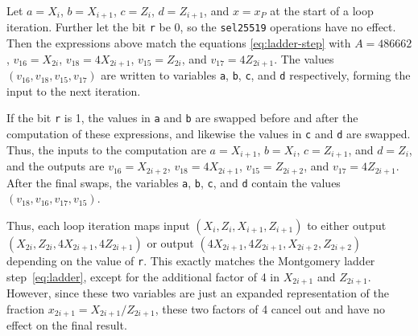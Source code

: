 \documentclass{article}
\begin{document}
Let $a = X_i$, $b = X_{i+1}$, $c = Z_i$, $d = Z_{i+1}$, and $x = x_P$ at the start of a loop iteration.
Further let the bit \verb|r| be 0, so the \verb|sel25519| operations have no effect.
Then the expressions above match the equations \eqref{eq:ladder-step} with $A = 486662$, $v_{16} = X_{2i}$, $v_{18} = 4X_{2i+1}$, $v_{15} = Z_{2i}$, and $v_{17} = 4Z_{2i+1}$.
The values $(v_{16}, v_{18}, v_{15}, v_{17})$ are written to variables \verb|a|, \verb|b|, \verb|c|, and \verb|d| respectively, forming the input to the next iteration.

If the bit \verb|r| is 1, the values in \verb|a| and \verb|b| are swapped before and after the computation of these expressions, and likewise the values in \verb|c| and \verb|d| are swapped.
Thus, the inputs to the computation are $a = X_{i+1}$, $b = X_i$, $c = Z_{i+1}$, and $d = Z_i$, and the outputs are $v_{16} = X_{2i+2}$, $v_{18} = 4X_{2i+1}$, $v_{15} = Z_{2i+2}$, and $v_{17} = 4Z_{2i+1}$.
After the final swaps, the variables \verb|a|, \verb|b|, \verb|c|, and \verb|d| contain the values $(v_{18}, v_{16}, v_{17}, v_{15})$.

Thus, each loop iteration maps input $(X_i, Z_i, X_{i+1}, Z_{i+1})$ to either output $(X_{2i}, Z_{2i}, 4X_{2i+1}, 4Z_{2i+1})$ or output $(4X_{2i+1}, 4Z_{2i+1}, X_{2i+2}, Z_{2i+2})$ depending on the value of \verb|r|.
This exactly matches the Montgomery ladder step~\eqref{eq:ladder}, except for the additional factor of 4 in $X_{2i+1}$ and $Z_{2i+1}$.
However, since these two variables are just an expanded representation of the fraction $x_{2i+1} = X_{2i+1}/Z_{2i+1}$, these two factors of 4 cancel out and have no effect on the final result.







\end{document}
